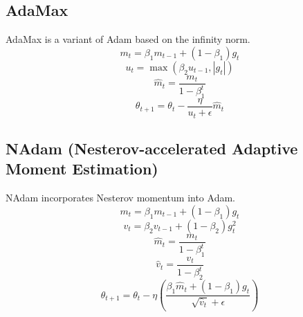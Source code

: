 \documentclass{article}
\begin{document}
\subsection{AdaMax}
AdaMax is a variant of Adam based on the infinity norm.
\begin{equation}
m_t = \beta_1 m_{t-1} + (1 - \beta_1) g_t
\end{equation}
\begin{equation}
u_t = \max(\beta_2 u_{t-1}, |g_t|)
\end{equation}
\begin{equation}
\hat{m}_t = \frac{m_t}{1 - \beta_1^t}
\end{equation}
\begin{equation}
\theta_{t+1} = \theta_t - \frac{\eta}{u_t + \epsilon} \hat{m}_t
\end{equation}

\subsection{NAdam (Nesterov-accelerated Adaptive Moment Estimation)}
NAdam incorporates Nesterov momentum into Adam.
\begin{equation}
m_t = \beta_1 m_{t-1} + (1 - \beta_1) g_t
\end{equation}
\begin{equation}
v_t = \beta_2 v_{t-1} + (1 - \beta_2) g_t^2
\end{equation}
\begin{equation}
\hat{m}_t = \frac{m_t}{1 - \beta_1^t}
\end{equation}
\begin{equation}
\hat{v}_t = \frac{v_t}{1 - \beta_2^t}
\end{equation}
\begin{equation}
\theta_{t+1} = \theta_t - \eta \left( \frac{\beta_1 \hat{m}_t + (1 - \beta_1) g_t}{\sqrt{\hat{v}_t} + \epsilon} \right)
\end{equation}
\end{document}
